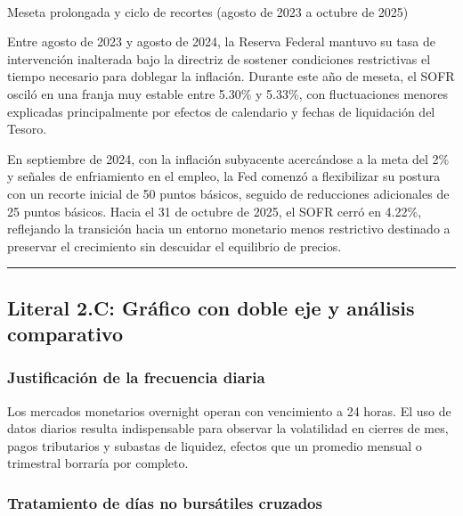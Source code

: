 \documentclass[
  10pt,
  letterpaper,
  DIV=11,
  numbers=noendperiod]{scrartcl}
\makeatletter
\let\oldparagraph\paragraph
\renewcommand{\paragraph}{
    \@ifstar
      \xxxParagraphStar
      \xxxParagraphNoStar
  }
\newcommand{\xxxParagraphStar}[1]{\oldparagraph*{#1}\mbox{}}
\newcommand{\xxxParagraphNoStar}[1]{\oldparagraph{#1}\mbox{}}
\makeatother
\begin{document}
\paragraph{Meseta prolongada y ciclo de recortes (agosto de 2023 a
octubre de
2025)}\label{meseta-prolongada-y-ciclo-de-recortes-agosto-de-2023-a-octubre-de-2025}

Entre agosto de 2023 y agosto de 2024, la Reserva Federal mantuvo su
tasa de intervención inalterada bajo la directriz de sostener
condiciones restrictivas el tiempo necesario para doblegar la inflación.
Durante este año de meseta, el SOFR osciló en una franja muy estable
entre 5.30\% y 5.33\%, con fluctuaciones menores explicadas
principalmente por efectos de calendario y fechas de liquidación del
Tesoro.

En septiembre de 2024, con la inflación subyacente acercándose a la meta
del 2\% y señales de enfriamiento en el empleo, la Fed comenzó a
flexibilizar su postura con un recorte inicial de 50 puntos básicos,
seguido de reducciones adicionales de 25 puntos básicos. Hacia el 31 de
octubre de 2025, el SOFR cerró en 4.22\%, reflejando la transición hacia
un entorno monetario menos restrictivo destinado a preservar el
crecimiento sin descuidar el equilibrio de precios.

\begin{center}\rule{0.5\linewidth}{0.5pt}\end{center}

\subsection{Literal 2.C: Gráfico con doble eje y análisis
comparativo}\label{literal-2.c-gruxe1fico-con-doble-eje-y-anuxe1lisis-comparativo}

\subsubsection{Justificación de la frecuencia
diaria}\label{justificaciuxf3n-de-la-frecuencia-diaria}

Los mercados monetarios overnight operan con vencimiento a 24 horas. El
uso de datos diarios resulta indispensable para observar la volatilidad
en cierres de mes, pagos tributarios y subastas de liquidez, efectos que
un promedio mensual o trimestral borraría por completo.

\subsubsection{Tratamiento de días no bursátiles
cruzados}\label{tratamiento-de-duxedas-no-bursuxe1tiles-cruzados}
\end{document}
